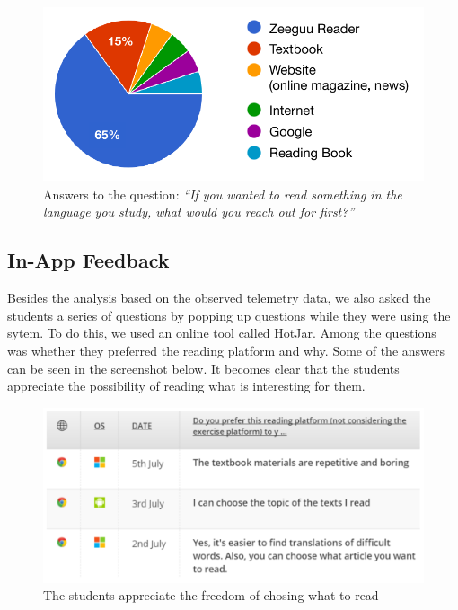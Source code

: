  \begin{figure}[h!]
    \centering
      \includegraphics[width=1.05\columnwidth]{figures/opinions/reader_vs_textbook}
      \caption{Answers to the question: {\em ``If you wanted to read something in the language you study, what would you reach out for first?''}}
      \label{fig:preferred_reader}
    \end{figure}



\subsection{In-App Feedback}
Besides the analysis  based on the observed telemetry data, we also asked the students a series of questions by popping up questions while they were using the sytem. To do this, we used an online tool called HotJar. Among the questions was whether they preferred the reading platform and why. Some of the answers can be seen in the screenshot below. It becomes clear that the students appreciate the possibility of reading what is interesting for them.

    \begin{figure}[h!]
    \centering
      \includegraphics[width=\columnwidth]{figures/opinion_on_reading_platform}
      \caption{The students appreciate the freedom of chosing what to read}
    \end{figure}


